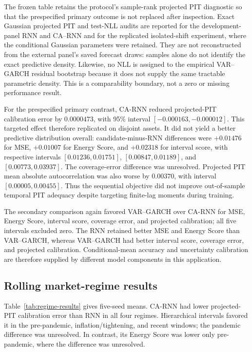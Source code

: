 \documentclass[11pt]{article}
\begin{document}
The frozen table retains the protocol's sample-rank projected PIT diagnostic so
that the prespecified primary outcome is not replaced after inspection. Exact
Gaussian projected PIT and test-NLL audits are reported for the development-panel
RNN and CA--RNN and for the replicated isolated-shift experiment, where the
conditional Gaussian parameters were retained. They are not reconstructed from
the external panel's saved forecast draws: samples alone do not identify the
exact predictive density. Likewise, no NLL is assigned to the empirical
VAR--GARCH residual bootstrap because it does not supply the same tractable
parametric density. This is a comparability boundary, not a zero or missing
performance result.

For the prespecified primary contrast, CA-RNN reduced projected-PIT
calibration error by $0.0000473$, with 95\% interval
$[-0.000163,-0.000012]$. This targeted effect therefore replicated on disjoint
assets. It did not yield a better predictive distribution overall:
candidate-minus-RNN differences were $+0.01476$ for MSE, $+0.01007$ for Energy
Score, and $+0.02318$ for interval score, with respective intervals
$[0.01236,0.01751]$, $[0.00847,0.01189]$, and $[0.00773,0.03937]$.
The coverage-error difference was unresolved. Projected PIT mean absolute
autocorrelation was also worse by $0.00370$, with interval
$[0.00005,0.00455]$. Thus the sequential objective did not improve out-of-sample
temporal PIT adequacy despite targeting finite-lag moments during training.

The secondary comparison again favored VAR--GARCH over CA-RNN for
MSE, Energy Score, interval score, coverage error, and projected calibration; all
five intervals excluded zero. The RNN retained better MSE and Energy Score than
VAR--GARCH, whereas VAR--GARCH had better interval score, coverage error, and
projected calibration. Conditional-mean accuracy and uncertainty calibration are
therefore supplied by different model components in this application.

\subsection{Rolling market-regime results}

Table~\ref{tab:regime-results} gives five-seed means. CA-RNN had lower
projected-PIT calibration error than RNN in all four regimes. Hierarchical
intervals favored it in the pre-pandemic, inflation/tightening, and recent
windows; the pandemic difference was unresolved. In contrast, its Energy Score
was lower only pre-pandemic, where the difference was unresolved.
\end{document}
